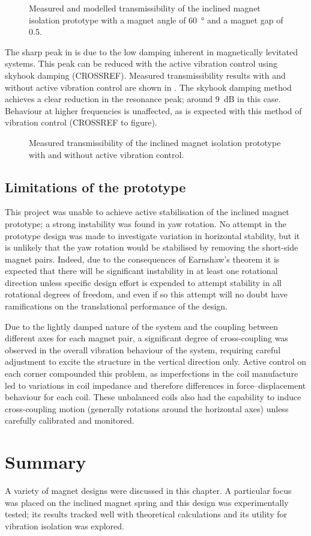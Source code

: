 \begin{figure}
\centering
{}
\caption{Measured and modelled transmissibility of the inclined magnet isolation prototype with a magnet angle of \SI{60}{\degree} and a magnet gap of \num{0.5}.}
\end{figure}

The sharp peak in  is due to the low damping inherent in magnetically levitated systems.
This peak can be reduced with the active vibration control using skyhook damping (CROSSREF).
Measured transmissibility results with and without active vibration control are shown in .
The skyhook damping method achieves a clear reduction in the resonance peak; around \SI{9}{dB} in this case.
Behaviour at higher frequencies is unaffected, as is expected with this method of vibration control (CROSSREF to figure).

\begin{figure}
\centering
{}
\caption{Measured transmissibility of the inclined magnet isolation prototype with and without active vibration control.}
\end{figure}

\subsection{Limitations of the prototype}

This project was unable to achieve active stabilisation of the inclined magnet prototype; a strong instability was found in yaw rotation.
No attempt in the prototype design was made to investigate variation in horizontal stability, but it is unlikely that the yaw rotation would be stabilised by removing the short-side magnet pairs.
Indeed, due to the consequences of Earnshaw's theorem it is expected that there will be significant instability in at least one rotational direction unless specific design effort is expended to attempt stability in all rotational degrees of freedom, and even if so this attempt will no doubt have ramifications on the translational performance of the design.

Due to the lightly damped nature of the system and the coupling between different axes for each magnet pair, a significant degree of cross-coupling was observed in the overall vibration behaviour of the system, requiring careful adjustment to excite the structure in the vertical direction only.
Active control on each corner compounded this problem, as imperfections in the coil manufacture led to variations in coil impedance and therefore differences in force--displacement behaviour for each coil.
These unbalanced coils also had the capability to induce cross-coupling motion (generally rotations around the horizontal axes) unless carefully calibrated and monitored.

\section{Summary}

A variety of magnet designs were discussed in this chapter.
A particular focus was placed on the inclined magnet spring and this design was experimentally tested; its results tracked well with theoretical calculations and its utility for vibration isolation was explored.

